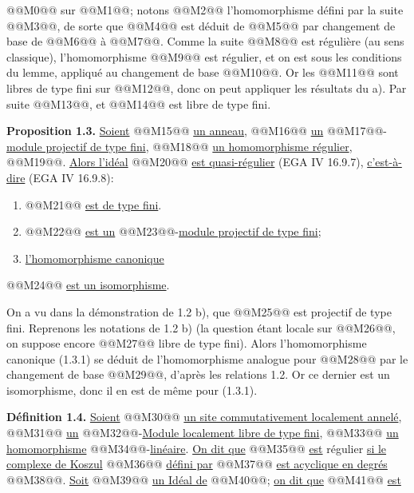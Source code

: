 
@@M0@@ sur @@M1@@; notons @@M2@@ l'homomorphisme défini par la suite @@M3@@, de sorte que @@M4@@ est déduit de @@M5@@ par changement de base de @@M6@@ à @@M7@@. Comme la suite @@M8@@ est régulière (au sens classique), l'homomorphisme @@M9@@ est régulier, et on est sous les conditions du lemme, appliqué au changement de base @@M10@@. Or les @@M11@@ sont libres de type fini sur @@M12@@, donc on peut appliquer les résultats du a). Par suite @@M13@@, et @@M14@@ est libre de type fini.

\textbf{Proposition 1.3.} \uline{Soient} @@M15@@ \uline{un anneau}, @@M16@@ \uline{un} @@M17@@-\uline{module projectif de type fini}, @@M18@@ \uline{un homomorphisme régulier}, @@M19@@. \uline{Alors l'idéal} @@M20@@ \uline{est quasi-régulier} (EGA IV 16.9.7), \uline{c'est-à-dire} (EGA IV 16.9.8):
\begin{enumerate}[label=\roman*)]
\item @@M21@@ \uline{est de type fini}.
\item @@M22@@ \uline{est un} @@M23@@-\uline{module projectif de type fini};
\item \uline{l'homomorphisme canonique}
\end{enumerate}
@@M24@@
\uline{est un isomorphisme}.

On a vu dans la démonstration de 1.2 b), que @@M25@@ est projectif de type fini. Reprenons les notations de 1.2 b) (la question étant locale sur @@M26@@, on suppose encore @@M27@@ libre de type fini). Alors l'homomorphisme canonique (1.3.1) se déduit de l'homomorphisme analogue pour @@M28@@ par le changement de base @@M29@@, d'après les relations 1.2. Or ce dernier est un isomorphisme, donc il en est de même pour (1.3.1).

\textbf{Définition 1.4.} \uline{Soient} @@M30@@ \uline{un site commutativement localement annelé}, @@M31@@ \uline{un} @@M32@@-\uline{Module localement libre de type fini}, @@M33@@ \uline{un homomorphisme} @@M34@@-\uline{linéaire}. \uline{On dit que} @@M35@@ \uline{est} régulier \uline{si le complexe de Koszul} @@M36@@ \uline{défini par} @@M37@@ \uline{est acyclique en degrés} @@M38@@. \uline{Soit} @@M39@@ \uline{un Idéal de} @@M40@@; \uline{on dit que} @@M41@@ \uline{est}
